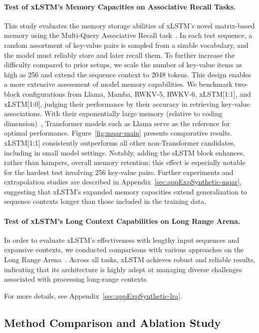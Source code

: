 \paragraph{Test of xLSTM's Memory Capacities on Associative Recall Tasks.} This study evaluates the memory storage abilities of xLSTM’s novel matrix-based memory using the Multi-Query Associative Recall task~\citep{Arora:23arxiv}. In each test sequence, a random assortment of key-value pairs is sampled from a sizable vocabulary, and the model must reliably store and later recall them. To further increase the difficulty compared to prior setups, we scale the number of key-value items as high as 256 and extend the sequence context to 2048 tokens. This design enables a more extensive assessment of model memory capabilities. We benchmark two-block configurations from Llama, Mamba, RWKV-5, RWKV-6, xLSTM[1:1], and xLSTM[1:0], judging their performance by their accuracy in retrieving key-value associations. With their exponentially large memory (relative to coding dimension)~\citep{Ramsauer:21}, Transformer models such as Llama serve as the reference for optimal performance. Figure~\ref{fig:mqar-main} presents comparative results. xLSTM[1:1] consistently outperforms all other non-Transformer candidates, including in small model settings. Notably, adding the sLSTM block enhances, rather than hampers, overall memory retention; this effect is especially notable for the hardest test involving 256 key-value pairs. Further experiments and extrapolation studies are described in Appendix~\ref{sec:appExpSynthetic-mqar}, suggesting that xLSTM's expanded memory capacities extend generalization to sequence contexts longer than those included in the training data.

\paragraph{Test of xLSTM's Long Context Capabilities on Long Range Arena.} In order to evaluate xLSTM's effectiveness with lengthy input sequences and expansive contexts, we conducted comparisons with various approaches on the Long Range Arena~\citep{Tay:21}. Across all tasks, xLSTM achieves robust and reliable results, indicating that its architecture is highly adept at managing diverse challenges associated with processing long-range contexts.

For more details, see Appendix~\ref{sec:appExpSynthetic-lra}.

\subsection{Method Comparison and Ablation Study}
\label{sec:ExpComparison}

